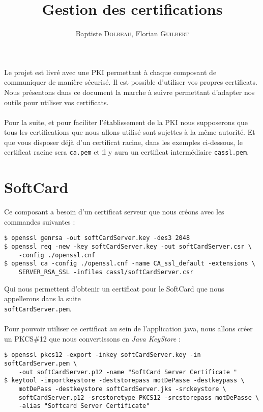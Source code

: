 \documentclass[a4paper,10pt]{article}
\title{Gestion des certifications}
\author{Baptiste \textsc{Dolbeau}, Florian \textsc{Guilbert}}
\begin{document}
\maketitle
\tableofcontents

\clearpage

Le projet est livré avec une PKI permettant à chaque composant de communiquer
de manière sécurisé. Il est possible d'utiliser vos propres certificats. 
Nous présentons dans ce document la marche à suivre permettant d'adapter 
nos outils pour utiliser vos certificats.

\paragraph{}
Pour la suite, et pour faciliter l'établissement de la PKI nous supposerons
que tous les certifications que nous allons utilisé sont sujettes à la 
même autorité. Et que vous disposer déjà d'un certificat racine, dans 
les exemples ci-dessous, le certificat racine sera \texttt{ca.pem} et 
il y aura un certificat intermédiaire \texttt{cassl.pem}.

\section{SoftCard}
Ce composant a besoin d'un certificat serveur que nous créons avec les 
commandes suivantes : 
\begin{verbatim}
$ openssl genrsa -out softCardServer.key -des3 2048
$ openssl req -new -key softCardServer.key -out softCardServer.csr \
    -config ./openssl.cnf
$ openssl ca -config ./openssl.cnf -name CA_ssl_default -extensions \
    SERVER_RSA_SSL -infiles cassl/softCardServer.csr
\end{verbatim}
Qui nous permettent d'obtenir un certificat pour le SoftCard que nous 
appellerons dans la suite \\ \texttt{softCardServer.pem}.

\paragraph{}
Pour pouvoir utiliser ce certificat au sein de l'application java, nous allons
créer un PKCS\#12 que nous convertissons en \emph{Java KeyStore} : 
\begin{verbatim}
$ openssl pkcs12 -export -inkey softCardServer.key -in softCardServer.pem \ 
    -out softCardServer.p12 -name "SoftCard Server Certificate "
$ keytool -importkeystore -deststorepass motDePasse -destkeypass \ 
    motDePass -destkeystore softCardServer.jks -srckeystore \ 
    softCardServer.p12 -srcstoretype PKCS12 -srcstorepass motDePasse \ 
    -alias "Softcard Server Certificate"
\end{verbatim}
\end{document}
